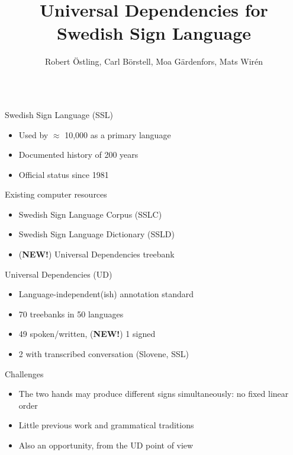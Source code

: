 \documentclass[final]{beamer}
\title{Universal Dependencies for Swedish Sign Language}
\author{Robert {\"O}stling, Carl B{\"o}rstell, Moa G{\"a}rdenfors,
    Mats Wir{\'e}n}
\institute{Stockholm University}
\begin{document}
\begin{frame}{}
    \vfill
    \begin{columns}[t]
        \begin{column}{.48\linewidth}

            \begin{block}{\large Swedish Sign Language (SSL)}
                \begin{itemize}
                    \item Used by $\approx$ 10,000 as a primary language
                    \item Documented history of 200 years
                    \item Official status since 1981
                \end{itemize}
            \end{block}

            \begin{block}{\large Existing computer resources}
                \begin{itemize}
                    \item Swedish Sign Language Corpus (SSLC)
                    \item Swedish Sign Language Dictionary (SSLD)
                    \item (\textbf{NEW!}) Universal Dependencies treebank
                \end{itemize}
            \end{block}

            \begin{block}{\large Universal Dependencies (UD)}
                \begin{itemize}
                    \item Language-independent(ish) annotation standard
                    \item 70 treebanks in 50 languages
                    \item 49 spoken/written, (\textbf{NEW!}) 1 signed
                    \item 2 with transcribed conversation (Slovene, SSL)
                \end{itemize}
            \end{block}

            \begin{block}{\large Challenges}
                \begin{itemize}
                    \item The two hands may produce different signs
                        simultaneously: no fixed linear order
                    \item Little previous work and grammatical traditions
                    \item Also an opportunity, from the UD point of view
                \end{itemize}
            \end{block}



\end{column}
\end{columns}
\end{frame}
\end{document}
